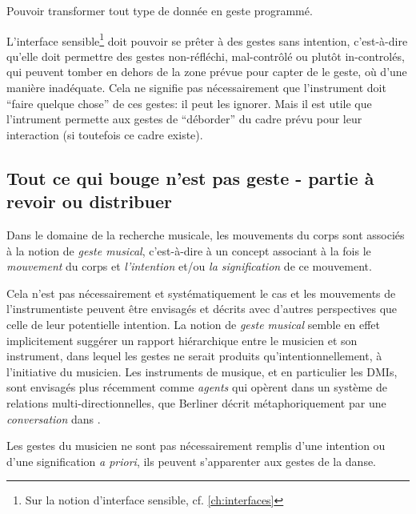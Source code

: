 Pouvoir transformer tout type de donnée en geste programmé.


L'interface sensible\footnote{Sur la notion d'interface sensible, cf. \ref{ch:interfaces}} doit pouvoir se prêter à des gestes sans intention, c'est-à-dire qu'elle doit permettre des gestes non-réfléchi, mal-contrôlé ou plutôt in-controlés, qui peuvent tomber en dehors de la zone prévue pour capter de le geste, où d'une manière inadéquate. Cela ne signifie pas nécessairement que l'instrument doit ``faire quelque chose'' de ces gestes: il peut les ignorer.  Mais il est utile que l'intrument permette aux gestes de ``déborder'' du cadre prévu pour leur interaction (si toutefois ce cadre existe).


\subsection*{Tout ce qui bouge n'est pas geste - partie à revoir ou distribuer}

Dans le domaine de la recherche musicale, les mouvements du corps sont associés à la notion de \textit{geste musical}, c'est-à-dire à un concept associant à la fois le \textit{mouvement} du corps et \textit{l'intention} et/ou \textit{la signification} de ce mouvement. 

Cela n'est pas nécessairement et systématiquement le cas et les mouvements de l'instrumentiste peuvent être envisagés et décrits avec d'autres perspectives que celle de leur potentielle intention.  La notion de \textit{geste musical} semble en effet implicitement suggérer un rapport hiérarchique entre le musicien et son instrument, dans lequel les gestes ne serait produits qu'intentionnellement, à l'initiative du musicien. Les instruments de musique, et en particulier les DMIs, sont envisagés plus récemment comme \textit{agents} qui opèrent dans un système de relations multi-directionnelles, que Berliner décrit métaphoriquement par une \textit{conversation} dans \cite{berliner_thinking_2009}.  



Les gestes du musicien ne sont pas nécessairement remplis d'une intention ou d'une signification \textit{a priori}, ils peuvent s'apparenter aux gestes de la danse.




